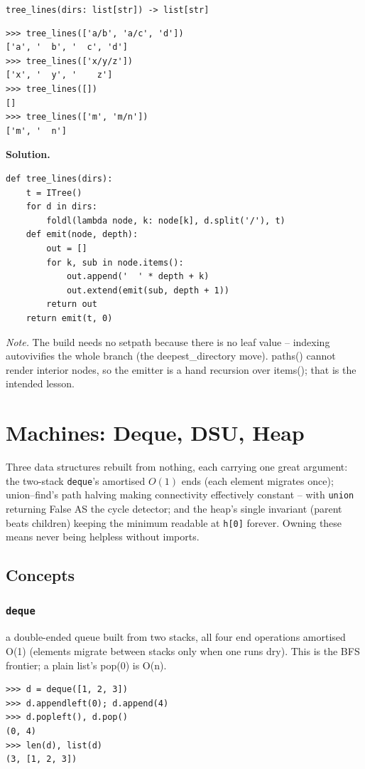 \documentclass[10pt,letterpaper]{book}
\begin{document}
\noindent\texttt{tree\_lines(dirs: list[str]) -> list[str]}
\begin{lstlisting}[style=ex]
>>> tree_lines(['a/b', 'a/c', 'd'])
['a', '  b', '  c', 'd']
>>> tree_lines(['x/y/z'])
['x', '  y', '    z']
>>> tree_lines([])
[]
>>> tree_lines(['m', 'm/n'])
['m', '  n']
\end{lstlisting}
\noindent\textbf{Solution.}
\begin{lstlisting}[style=code]
def tree_lines(dirs):
    t = ITree()
    for d in dirs:
        foldl(lambda node, k: node[k], d.split('/'), t)
    def emit(node, depth):
        out = []
        for k, sub in node.items():
            out.append('  ' * depth + k)
            out.extend(emit(sub, depth + 1))
        return out
    return emit(t, 0)
\end{lstlisting}
\noindent\textit{Note.} The build needs no setpath because there is no leaf value -- indexing autovivifies the whole branch (the deepest\_directory move). paths() cannot render interior nodes, so the emitter is a hand recursion over items(); that is the intended lesson.

\clearpage
\chapter{Machines: Deque, DSU, Heap}

Three data structures rebuilt from nothing, each carrying one great argument:
the two-stack \texttt{deque}'s amortised $O(1)$ ends (each element migrates
once); union--find's path halving making connectivity effectively constant
-- with \texttt{union} returning False AS the cycle detector; and the heap's
single invariant (parent beats children) keeping the minimum readable at
\texttt{h[0]} forever. Owning these means never being helpless without
imports.
\section{Concepts}
\subsection{\texttt{deque}}\label{def:deque}
a double-ended queue built from two stacks, all four end operations amortised O(1) (elements migrate between stacks only when one runs dry). This is the BFS frontier; a plain list's pop(0) is O(n).
\begin{lstlisting}[style=ex]
>>> d = deque([1, 2, 3])
>>> d.appendleft(0); d.append(4)
>>> d.popleft(), d.pop()
(0, 4)
>>> len(d), list(d)
(3, [1, 2, 3])
\end{lstlisting}
\end{document}
